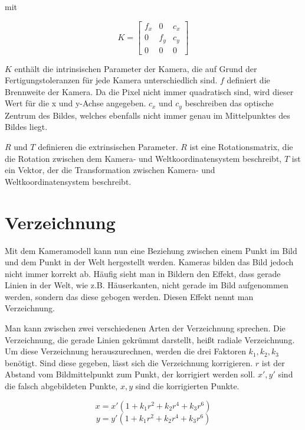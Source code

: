 mit 

\begin{equation}
  K = 
  \begin{bmatrix}
  	f_x & 0 & c_x \\
  	0 & f_y & c_y \\
  	0 & 0 & 0
  \end{bmatrix}
\end{equation}

$K$ enthält die intrinsischen Parameter der Kamera, die auf Grund der Fertigungstoleranzen für jede Kamera unterschiedlich sind. $f$ definiert die Brennweite der Kamera. Da die Pixel nicht immer quadratisch sind, wird dieser Wert für die x und y-Achse angegeben. $c_x$ und $c_y$ beschreiben das optische Zentrum des Bildes, welches ebenfalls nicht immer genau im Mittelpunktes des Bildes liegt.

$R$ und $T$ definieren die extrinsischen Parameter. $R$ ist eine Rotationsmatrix, die die Rotation zwischen dem Kamera- und Weltkoordinatensystem beschreibt, $T$ ist ein Vektor, der die Transformation zwischen Kamera- und Weltkoordinatensystem beschreibt.

\section{Verzeichnung} %
\label{sec:verzeichnung}
Mit dem Kameramodell kann nun eine Beziehung zwischen einem Punkt im Bild und dem Punkt in der Welt hergestellt werden. Kameras bilden das Bild jedoch nicht immer korrekt ab. Häufig sieht man in Bildern den Effekt, dass gerade Linien in der Welt, wie z.B. Häuserkanten, nicht gerade im Bild aufgenommen werden, sondern das diese gebogen werden. Diesen Effekt nennt man Verzeichnung.

Man kann zwischen zwei verschiedenen Arten der Verzeichnung sprechen. Die Verzeichnung, die gerade Linien gekrümmt darstellt, heißt radiale Verzeichnung. Um diese Verzeichnung herauszurechnen, werden die drei Faktoren $k_1, k_2, k_3$ benötigt. Sind diese gegeben, lässt sich die Verzeichnung korrigieren. $r$ ist der Abstand vom Bildmittelpunkt zum Punkt, der korrigiert werden soll. $x', y'$ sind die falsch abgebildeten Punkte, $x,y$ sind die korrigierten Punkte.

\begin{equation}
	x = x'(1 + k_1 r^2 + k_2 r^4 + k_3 r^6)
\end{equation}
\begin{equation}
	y = y'(1 + k_1 r^2 + k_2 r^4 + k_3 r^6)
\end{equation}

